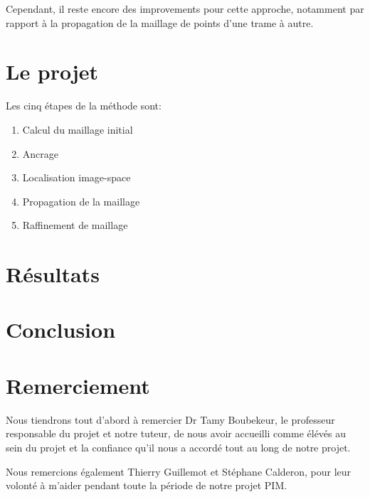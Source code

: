 \documentclass[a4paper,10pt]{article}
\begin{document}
Cependant, il reste encore des improvements pour cette approche, notamment par rapport à la propagation de la maillage de points d'une trame à autre.

\section{Le projet}

Les cinq étapes de la méthode sont:
\begin{enumerate}
\item Calcul du maillage initial
\item Ancrage
\item Localisation image-space
\item Propagation de la maillage
\item Raffinement de maillage
\end{enumerate}

\section{Résultats}

\section{Conclusion}

\section{Remerciement}
Nous tiendrons tout d’abord à remercier Dr Tamy Boubekeur, le professeur responsable du projet et notre tuteur, de nous avoir accueilli comme élévés au sein du projet et la confiance qu’il nous a accordé tout au long de notre projet.

Nous remercions également Thierry Guillemot et Stéphane Calderon, pour leur volonté à m’aider pendant toute la période de notre projet PIM.

\nocite{Beeler:2010:HSC:1778765.1778777}
\nocite{Beeler:2011:HPF:2010324.1964970}

\begin{small}
  
\end{small}
\section*{}
\end{document}
